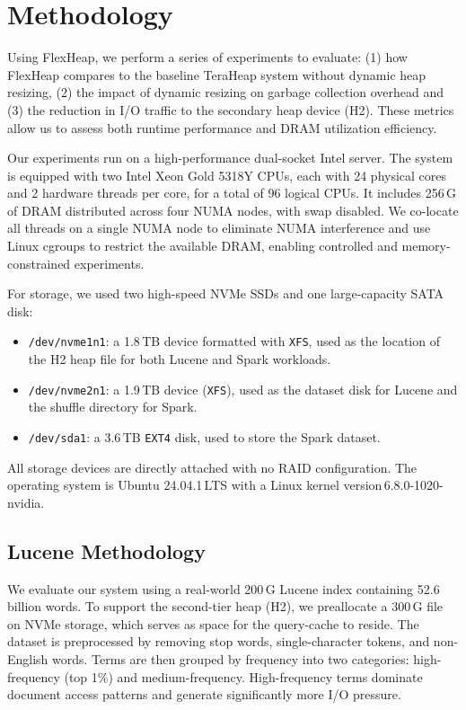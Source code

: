 \section{Methodology}

Using FlexHeap, we perform a series of experiments to evaluate: 
(1) how FlexHeap compares to the baseline TeraHeap system without dynamic heap resizing,
(2) the impact of dynamic resizing on garbage collection overhead and
(3) the reduction in I/O traffic to the secondary heap device (H2).
These metrics allow us to assess both runtime performance and DRAM utilization efficiency.

Our experiments run on a high-performance dual-socket Intel server.
The system is equipped with two Intel Xeon Gold 5318Y CPUs, each with 24 physical cores 
and 2 hardware threads per core, for a total of 96 logical CPUs. It includes 256\,G of DRAM 
distributed across four NUMA nodes, with swap disabled. We co-locate all threads on a single
NUMA node to eliminate NUMA interference and use Linux cgroups to restrict the available DRAM,
enabling controlled and memory-constrained experiments.

For storage, we used two high-speed NVMe SSDs and one large-capacity SATA disk:
\begin{itemize}
  \item \texttt{/dev/nvme1n1}: a 1.8\,TB device formatted with \texttt{XFS}, used as the location of 
                               the H2 heap file for both Lucene and Spark workloads.
  \item \texttt{/dev/nvme2n1}: a 1.9\,TB device (\texttt{XFS}), used as the dataset disk for Lucene 
                               and the shuffle directory for Spark.
  \item \texttt{/dev/sda1}: a 3.6\,TB \texttt{EXT4} disk, used to store the Spark dataset.
\end{itemize}

All storage devices are directly attached with no RAID configuration. The operating system is Ubuntu 
24.04.1\,LTS with a Linux kernel version\,6.8.0-1020-nvidia.
\subsection{Lucene Methodology}

We evaluate our system using a real-world 200\,G Lucene index containing 52.6 billion words. 
To support the second-tier heap (H2), we preallocate a 300\,G file on NVMe storage, which serves as space 
for the query-cache to reside.
The dataset is preprocessed by removing stop words, single-character tokens, and non-English words. 
Terms are then grouped by frequency into two categories: high-frequency (top 1\%) and medium-frequency. 
High-frequency terms dominate document access patterns and generate significantly more I/O pressure.


